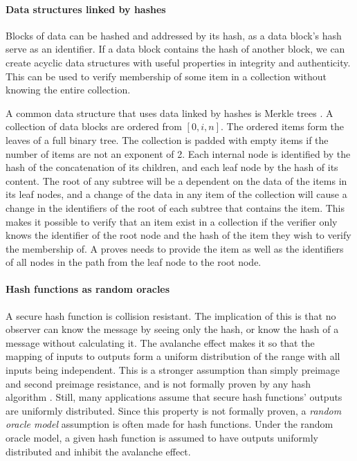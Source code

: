 \paragraph{Data structures linked by hashes}
Blocks of data can be hashed and addressed by its hash, as a data block's hash serve as an identifier. If a data block contains the hash of another block, we can create acyclic data structures with useful properties in integrity and authenticity. This can be used to verify membership of some item in a collection without knowing the entire collection.

A common data structure that uses data linked by hashes is Merkle trees \cite{merkle_digital_1988}. A collection of data blocks are ordered from $[0, i, n]$. The ordered items form the leaves of a full binary tree. The collection is padded with empty items if the number of items are not an exponent of 2. Each internal node is identified by the hash of the concatenation of its children, and each leaf node by the hash of its content. The root of any subtree will be a dependent on the data of the items in its leaf nodes, and a change of the data in any item of the collection will cause a change in the identifiers of the root of each subtree that contains the item. 
This makes it possible to verify that an item exist in a collection if the verifier only knows the identifier of the root node and the hash of the item they wish to verify the membership of. A proves needs to provide the item as well as the identifiers of all nodes in the path from the leaf node to the root node. 

\paragraph{Hash functions as random oracles}
A secure hash function is collision resistant. The implication of this is that no observer can know the message by seeing only the hash, or know the hash of a message without calculating it. The avalanche effect makes it so that the mapping of inputs to outputs form a uniform distribution of the range with all inputs being independent. This is a stronger assumption than simply preimage and second preimage resistance, and is not formally proven by any hash algorithm \cite[p.~179-181]{lindell2014introduction}. Still, many applications assume that secure hash functions' outputs are uniformly distributed. Since this property is not formally proven, a \emph{random oracle model} assumption is often made for hash functions. Under the random oracle model, a given hash function is assumed to have outputs uniformly distributed and inhibit the avalanche effect.

